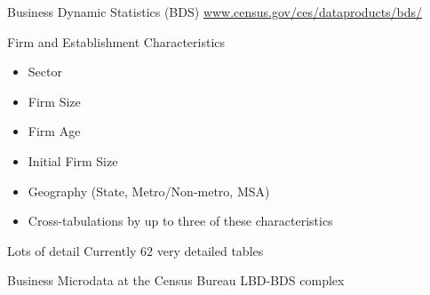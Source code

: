 \begin{frame}{Business Dynamic Statistics (BDS)}
\href{http://www.census.gov/ces/dataproducts/bds/}{www.census.gov/ces/dataproducts/bds/}
\begin{block}{Firm and Establishment Characteristics}
\begin{itemize}
\item Sector
\item Firm Size
\item Firm Age
\item Initial Firm Size
\item Geography (State, Metro/Non-metro, MSA)
\item Cross-tabulations by up to three of these characteristics
\end{itemize}
\end{block}
\begin{block}{Lots of detail}
\alert{Currently} 62 very detailed tables
\end{block}
\end{frame}


\begin{frame}{Business Microdata at the Census Bureau}
\vfill
\Huge LBD-BDS complex
\end{frame}

